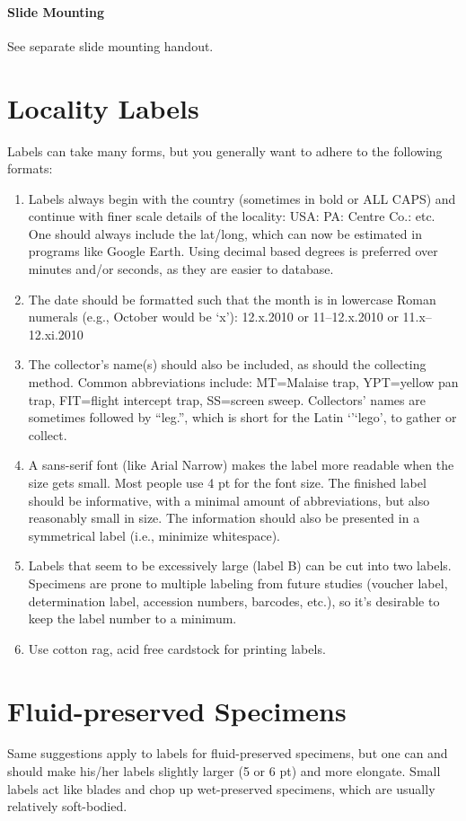 \documentclass[letterpaper, 11pt]{article}
\begin{document}
\paragraph*{Slide Mounting} See separate slide mounting handout.

\section*{Locality Labels}

Labels can take many forms, but you generally want to adhere to the following formats:

\begin{enumerate}
\item Labels always begin with the country (sometimes in bold or ALL CAPS) and continue with finer scale details of the locality: USA: PA: Centre Co.: etc. One should always include the lat/long, which can now be estimated in programs like Google Earth. Using decimal based degrees is preferred over minutes and/or seconds, as they are easier to database.
\item The date should be formatted such that the month is in lowercase Roman numerals (e.g., October would be ‘x’): 12.x.2010 or 11--12.x.2010 or 11.x--12.xi.2010
\item The collector’s name(s) should also be included, as should the collecting method. Common abbreviations include: MT=Malaise trap, YPT=yellow pan trap, FIT=flight intercept trap, SS=screen sweep. Collectors’ names are sometimes followed by ``leg.'', which is short for the Latin `'`lego', to gather or collect.
\item A sans-serif font (like Arial Narrow) makes the label more readable when the size gets small. Most people use 4 pt for the font size. The finished label should be informative, with a minimal amount of abbreviations, but also reasonably small in size. The information should also be presented in a symmetrical label (i.e., minimize whitespace).
\item Labels that seem to be excessively large (label B) can be cut into two labels. Specimens are prone to multiple labeling from future studies (voucher label, determination label, accession numbers, barcodes, etc.), so it’s desirable to keep the label number to a minimum.
\item Use cotton rag, acid free cardstock for printing labels.
\end{enumerate}

\section{Fluid-preserved Specimens}
Same suggestions apply to labels for fluid-preserved specimens, but one can and should make his/her labels slightly larger (5 or 6 pt) and more elongate. Small labels act like blades and chop up wet-preserved specimens, which are usually relatively soft-bodied.
\end{document}
